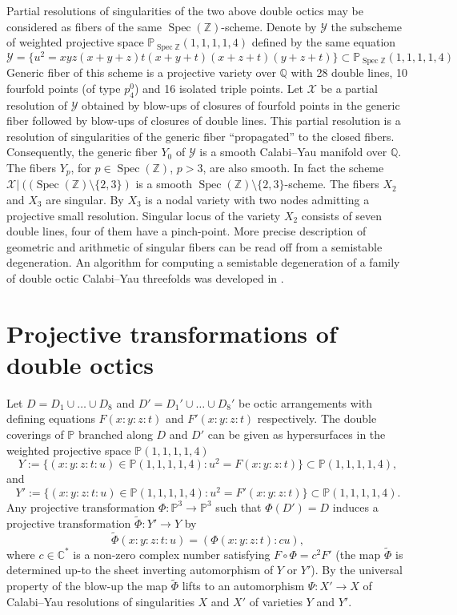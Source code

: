 \documentclass[12pt]{amsart}
\theoremstyle{plain}
\theoremstyle{remark}
\theoremstyle{definition}
\newcommand{\PP}{\mathbb P}
\newcommand{\lra}{\longrightarrow}
\newcommand\CC{{\mathbb C}}
\newcommand\ZZ{{\mathbb Z}}
\newcommand\QQ{{\mathbb Q}}
\numberwithin{table}{section}
\begin{document}
Partial resolutions of singularities of the two above double octics may be considered as fibers of the same  $\operatorname{Spec}(\mathbb Z)$-scheme. Denote by $\mathcal Y$ the subscheme of weighted projective space $\PP_{\operatorname{Spec}\ZZ}(1,1,1,1,4)$ defined by the same equation
\[\mathcal Y=\{u^{2} = xyz(x+y+z)t(x+y+t)(x+z+t)(y+z+t)\}\subset \PP_{{\operatorname{Spec}\ZZ}}(1,1,1,1,4)\]
Generic fiber of this scheme is a projective variety over $\QQ$ with 28 double lines, 10 fourfold points (of type $p_{4}^{0}$) and 16 isolated triple points.
Let $\mathcal X$ be a partial resolution of $\mathcal Y$ obtained by blow-ups of closures of fourfold points in the generic fiber followed by blow-ups of closures of double lines. This partial resolution is a resolution of singularities of the generic fiber ``propagated'' to the closed fibers. Consequently, the generic fiber $Y_{0}$ of $\mathcal Y$ is a smooth Calabi--Yau manifold over $\QQ$. The fibers $Y_{p}$, for $p\in \operatorname{Spec}(\ZZ)$, $p>3$, are also smooth. In fact the scheme $\mathcal X|\left((\operatorname{Spec}(\ZZ)\setminus\{2,3\}\right
)$ is a smooth $\operatorname{Spec}(\ZZ)\setminus\{2,3\}$-scheme.
The fibers $X_{2}$ and $X_{3}$ are singular. By \cite{CvS3} $X_{3}$ is a nodal variety with two nodes admitting a projective small resolution. Singular locus of the variety $X_{2}$ consists of seven double lines, four of them have a pinch-point. More precise description of geometric and arithmetic of singular fibers can be read off from a semistable degeneration. An algorithm for computing a semistable  degeneration of a family of double octic Calabi--Yau threefolds was developed in \cite{Oczko}.





\section{Projective transformations of double octics}
\label{sec:projtransf}

Let $D=D_{1}\cup\dots\cup D_{8}$ and $D'=D_{1}'\cup\dots\cup D_{8}'$
be octic arrangements with defining equations $F(x:y:z:t)$
and $F'(x:y:z:t)$ respectively. The double coverings of
$\PP$ branched along $D$ and $D'$ can be given as hypersurfaces in the
weighted projective space $\mathbb P(1,1,1,1,4)$
\[Y:=\{(x:y:z:t:u)\in \mathbb P(1,1,1,1,4)\colon
  u^{2}=F(x:y:z:t)\} \subset\mathbb P(1,1,1,1,4),\]
and
\[Y':=\{(x:y:z:t:u)\in \mathbb P(1,1,1,1,4)\colon
  u^{2}=F'(x:y:z:t)\} \subset\mathbb P(1,1,1,1,4).\]
Any projective transformation $\Phi:\PP^3\lra\PP^3$
such that $\Phi(D')=D$ induces a projective transformation $\tilde
\Phi:Y'\lra Y$  by
\[\tilde\Phi(x:y:z:t:u)=(\Phi(x:y:z:t):cu),\]
where $c\in\CC^{*}$ is a non-zero complex number satisfying
$F\circ\Phi=c^{2}F'$ (the map $\tilde\Phi$ is determined up-to the sheet
inverting automorphism of $Y$ or $Y'$).
By the universal property of the blow-up the map $\tilde\Phi$ lifts to an automorphism $\Psi:X'\lra X$ of Calabi--Yau resolutions of
singularities $X$ and $X'$ of varieties $Y$ and $Y'$.
\end{document}
